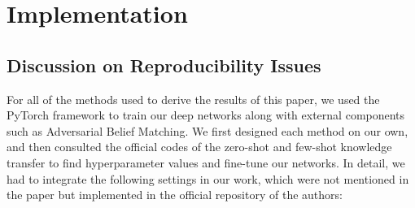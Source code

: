 \section{Implementation}

\subsection{Discussion on Reproducibility Issues}

For all of the methods used to derive the results of this paper, we used the PyTorch framework to train our deep networks along with external components such as Adversarial Belief Matching. We first designed each method on our own, and then consulted the official codes of the zero-shot and few-shot knowledge transfer to find hyperparameter values and fine-tune our networks. In detail, we had to integrate the following settings in our work, which were not mentioned in the paper\cite{Micaelli2019ZeroShotKT} but implemented in the official repository of the authors:

